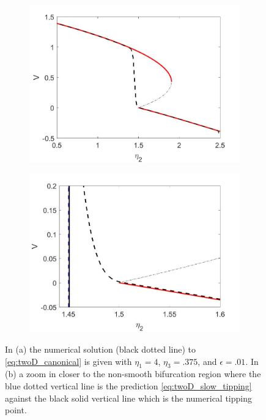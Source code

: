 \begin{figure}[H]
\centering
\begin{subfigure}{.5\textwidth}
  \centering
  \includegraphics[width=\linewidth]{twoD/slow_bif_diagram.jpg}
  \caption{}
\end{subfigure}%
\begin{subfigure}{.5\textwidth}
  \centering
  \includegraphics[width=\linewidth]{twoD/slow_bif_diagram_zoom.jpg}
  \caption{}
\end{subfigure}
\caption{In (a) the numerical solution (black dotted line) to \eqref{eq:twoD_canonical} is given with $\eta_1=4$, $\eta_3=.375$, and $\epsilon=.01$. In (b) a zoom in closer to the non-smooth bifurcation region where the blue dotted vertical line is the prediction \eqref{eq:twoD_slow_tipping} against the black solid vertical line which is the numerical tipping point.}
\label{fig:twoD_slow_Vnumerics}
\end{figure}

